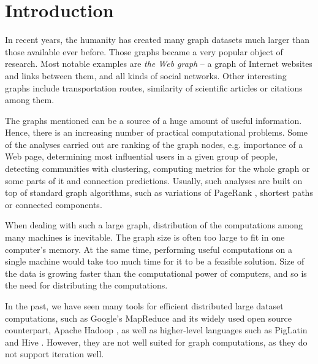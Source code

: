 
\chapter{Introduction}
In recent years, the humanity has created many graph datasets much larger than those available ever before.
Those graphs became a very popular object of research. Most notable examples are \emph{the Web graph} -- a graph of Internet websites and links between them, and all kinds of social networks. Other interesting graphs include transportation routes, similarity of scientific articles or citations among them.


The graphs mentioned can be a source of a huge amount of useful information. Hence, there is an increasing number of practical computational problems.
Some of the analyses carried out are ranking of the graph nodes, e.g. importance of a Web page, determining most influential users in a given group of people, detecting communities with clustering, computing metrics for the whole graph or some parts of it and connection predictions.
Usually, such analyses are built on top of standard graph algorithms, such as variations of PageRank \cite{pagerank}, shortest paths or connected components.

When dealing with such a large graph, distribution of the computations among many machines is inevitable. The graph size is often too large to fit in one computer's memory. At the same time, performing useful computations on a single machine would take too much time for it to be a feasible solution. Size of the data is growing faster than the computational power of computers, and so is the need for distributing the computations.

In the past, we have seen many tools for efficient distributed large dataset computations, such as Google's MapReduce \cite{mapreduce} and its widely used open source counterpart, Apache Hadoop \cite{hadoop}, as well as higher-level languages such as PigLatin \cite{piglatin} and Hive \cite{hive}. However, they are not well suited for graph computations, as they do not support iteration well.

